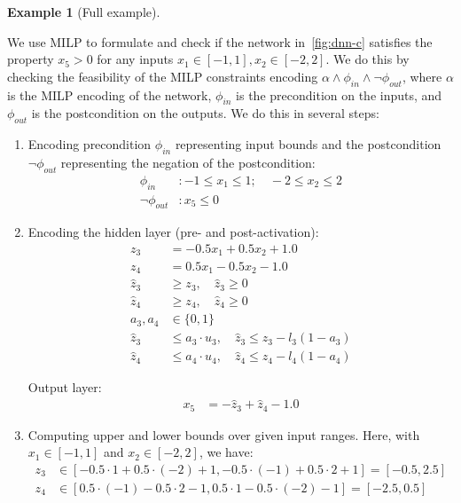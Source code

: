 \documentclass[oneside,11pt,dvipsnames]{book}
\numberwithin{equation}{section}
\theoremstyle{definition}
\newtheorem{example}{Example}[section]
\theoremstyle{remark}
\begin{document}
\begin{example}[Full example]\label{ex:milp-dnn}

    We use MILP to formulate and check if the network in~\autoref{fig:dnn-c} satisfies the property $x_5 > 0$ for any inputs $x_1 \in [-1,1], x_2\in[-2,2]$. We do this by checking the feasibility of the MILP constraints encoding $\alpha \land \phi_{in} \land \neg \phi_{out}$, where $\alpha$ is the MILP encoding of the network, $\phi_{in}$ is the precondition on the inputs, and $\phi_{out}$ is the postcondition on the outputs.  We do this in several steps:


\begin{enumerate}
\item Encoding precondition $\phi_{in}$ representing input bounds and the postcondition $\neg \phi_{out}$ representing the negation of the postcondition:
\begin{align*}
\phi_{in} &: -1 \le x_1 \le 1;\quad -2 \le x_2 \le 2 \\
\neg \phi_{out} &: x_5 \le 0
\end{align*}

\item Encoding the hidden layer (pre- and post-activation):
\begin{align*}
z_3 &= -0.5x_1 + 0.5x_2 + 1.0 \\
z_4 &= 0.5x_1 - 0.5x_2 - 1.0 \\
\hat{z}_3 &\ge z_3, \quad \hat{z}_3 \ge 0 \\
\hat{z}_4 &\ge z_4, \quad \hat{z}_4 \ge 0 \\
a_3, a_4 &\in \{0, 1\} \\
\hat{z}_3 &\le a_3 \cdot u_3, \quad \hat{z}_3 \le z_3 - l_3(1 - a_3) \\
\hat{z}_4 &\le a_4 \cdot u_4, \quad \hat{z}_4 \le z_4 - l_4(1 - a_4)
\end{align*}

Output layer:
\begin{align*}
x_5 &= -\hat{z}_3 + \hat{z}_4 - 1.0
\end{align*}


\item Computing upper and lower bounds over given input ranges. Here, with $x_1 \in [-1,1]$ and $x_2 \in [-2,2]$, we have:
\begin{align*}
z_3 &\in [-0.5 \cdot 1 + 0.5 \cdot (-2) + 1, -0.5 \cdot (-1) + 0.5 \cdot 2 + 1] = [-0.5, 2.5] \\
z_4 &\in [0.5 \cdot (-1) - 0.5 \cdot 2 - 1, 0.5 \cdot 1 - 0.5 \cdot (-2) - 1] = [-2.5, 0.5]
\end{align*}


\end{enumerate}
\end{example}
\end{document}
